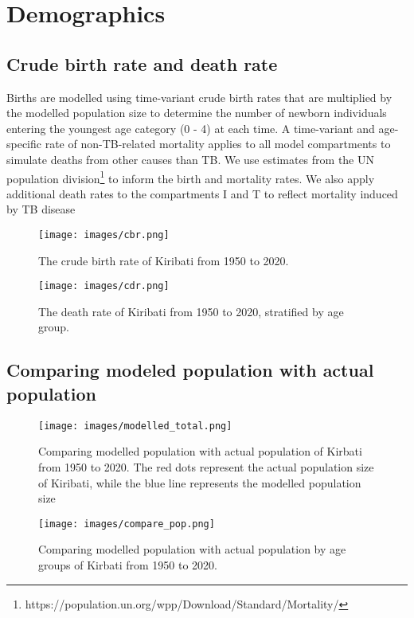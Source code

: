 

\section{Demographics}
\subsection{Crude birth rate and death rate}
Births are modelled using time-variant crude birth rates that are multiplied by the modelled population 
size to determine the number of newborn individuals entering the youngest age category (0 - 4) at each time. A time-variant 
and age-specific rate of non-TB-related mortality applies to all model compartments to simulate 
deaths from other causes than TB. We use estimates from the UN population division\footnote{https://population.un.org/wpp/Download/Standard/Mortality/} to inform the 
birth and mortality rates.
We also apply additional death rates to the compartments I and T to reflect mortality induced by TB 
disease
\begin{figure}[!htb]
    \texttt{[image: images/cbr.png]}
    \caption{The crude birth rate of Kiribati from 1950 to 2020.}
    \label{fig:cbr}
\end{figure}

\begin{figure}[!htb]
    \texttt{[image: images/cdr.png]}
    \caption{The death rate of Kiribati from 1950 to 2020, stratified by age group.}
    \label{fig:cdr}
\end{figure}

\subsection{Comparing modeled population with actual population}
\begin{figure}[!htb]
    \texttt{[image: images/modelled\_total.png]}
    \caption{Comparing modelled population with actual population of Kirbati from 1950 to 2020. The red dots represent the actual population size of Kiribati,
     while the blue line represents the modelled population size}
    \label{fig:modelled_total}
\end{figure}

\begin{figure}[!htb]
    \texttt{[image: images/compare\_pop.png]}
    \caption{Comparing modelled population with actual population by age groups of Kirbati from 1950 to 2020.}
    \label{fig:compare_group}
\end{figure}